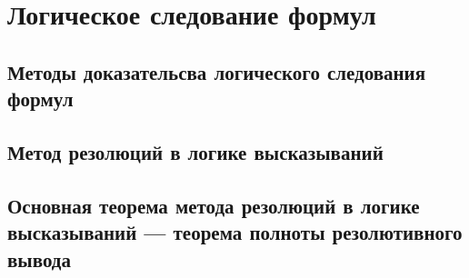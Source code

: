 \section{Логическое следование формул}
\subsection{Методы доказательсва логического следования формул}
\subsection{Метод резолюций в логике высказываний}
\subsection{Основная теорема метода резолюций в логике высказываний --- теорема полноты резолютивного вывода}